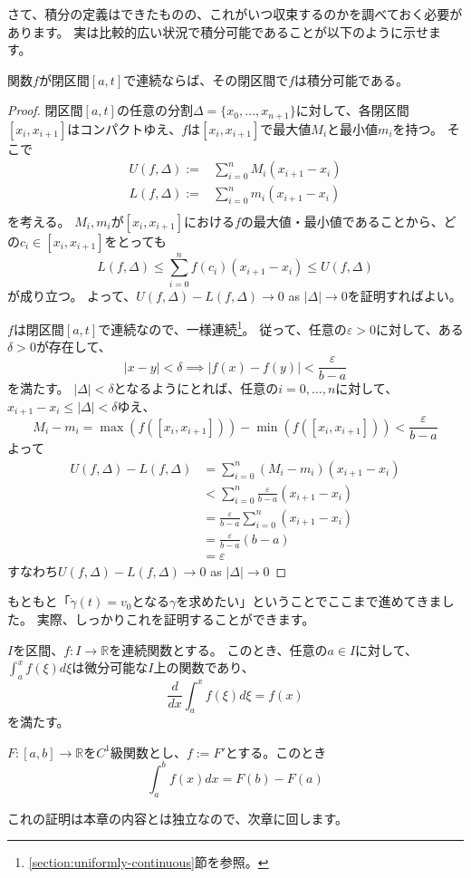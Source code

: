さて、積分の定義はできたものの、これがいつ収束するのかを調べておく必要があります。
実は比較的広い状況で積分可能であることが以下のように示せます。
\begin{theorem}
  関数$f$が閉区間$[a,t]$で連続ならば、その閉区間で$f$は積分可能である。
\end{theorem}
\begin{proof}
  閉区間$[a,t]$の任意の分割$\Delta=\{x_0,\dots,x_{n+1}\}$に対して、各閉区間$[x_i,x_{i+1}]$はコンパクトゆえ、$f$は$[x_i,x_{i+1}]$で最大値$M_i$と最小値$m_i$を持つ。
  そこで
  \begin{align*}
    U(f,\Delta):=&\sum_{i=0}^n M_i(x_{i+1}-x_i)\\
    L(f,\Delta):=&\sum_{i=0}^n m_i(x_{i+1}-x_i)\\
  \end{align*}
  を考える。
  $M_i,m_i$が$[x_i,x_{i+1}]$における$f$の最大値・最小値であることから、どの$c_i\in[x_i,x_{i+1}]$をとっても
  \[
    L(f,\Delta)\leq\sum_{i=0}^n f(c_i)(x_{i+1}-x_i)\leq U(f,\Delta)
  \]
  が成り立つ。
  よって、$U(f,\Delta)-L(f,\Delta)\to0$ as $|\Delta|\to0$を証明すればよい。

  $f$は閉区間$[a,t]$で連続なので、一様連続\footnote{\ref{section:uniformly-continuous}節を参照。}。
  従って、任意の$\varepsilon>0$に対して、ある$\delta>0$が存在して、
  \[
    |x-y|<\delta \implies |f(x)-f(y)|<\frac{\varepsilon}{b-a}
  \]
  を満たす。
  $|\Delta|<\delta$となるようにとれば、任意の$i=0,\dots,n$に対して、$x_{i+1}-x_i\leq|\Delta|<\delta$ゆえ、
  \[
    M_i-m_i=\max(f([x_i,x_{i+1}]))-\min(f([x_i,x_{i+1}]))<\frac{\varepsilon}{b-a}
  \]
  よって
  \begin{align*}
    U(f,\Delta)-L(f,\Delta)&=\sum_{i=0}^n (M_i-m_i)(x_{i+1}-x_i)\\
    &<\sum_{i=0}^n\frac{\varepsilon}{b-a}(x_{i+1}-x_i)\\
    &=\frac{\varepsilon}{b-a}\sum_{i=0}^n(x_{i+1}-x_i)\\
    &=\frac{\varepsilon}{b-a}(b-a)\\
    &=\varepsilon
  \end{align*}
  すなわち$U(f,\Delta)-L(f,\Delta)\to0$ as $|\Delta|\to0$
\end{proof}

もともと「$\dot\gamma(t)=v_0$となる$\gamma$を求めたい」ということでここまで進めてきました。
実際、しっかりこれを証明することができます。
\begin{theorem}
  $I$を区間、$f:I\to\mathbb{R}$を連続関数とする。
  このとき、任意の$a\in I$に対して、$\int_a^x f(\xi)d\xi$は微分可能な$I$上の関数であり、
  \[
    \frac{d}{dx}\int_a^x f(\xi)d\xi=f(x)
  \]
  を満たす。
\end{theorem}
\begin{corollary}
  $F:[a,b]\to\mathbb{R}$を$C^1$級関数とし、$f:=F'$とする。このとき
  \[
    \int_a^b f(x)dx=F(b)-F(a)
  \]
\end{corollary}
これの証明は本章の内容とは独立なので、次章に回します。

